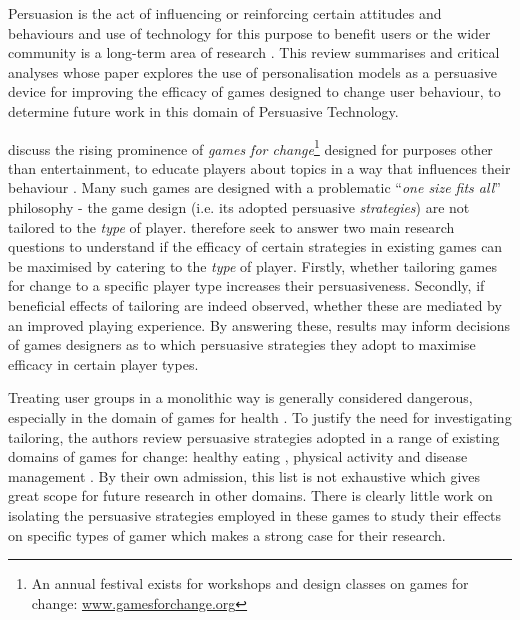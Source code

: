 \documentclass[11pt]{article}
\begin{document}

Persuasion is the act of influencing or reinforcing certain attitudes and behaviours \citep{khaled2008} and use of technology for this purpose to benefit users or the wider community is a long-term area of research \citep{fogg2002}. This review summarises and critical analyses \citet{orji2017} whose paper explores the use of personalisation models as a persuasive device for improving the efficacy of games designed to change user behaviour, to determine future work in this domain of Persuasive Technology.

\citet{orji2017} discuss the rising prominence of \textit{games for change}\footnote{An annual festival exists for workshops and design classes on games for change: \url{www.gamesforchange.org}} designed for purposes other than entertainment, to educate players about topics in a way that influences their behaviour \citep{busch2015}. Many such games are designed with a problematic ``\textit{one size fits all}'' philosophy - the game design (i.e. its adopted persuasive \textit{strategies}) are not tailored to the \textit{type} of player. \citet{orji2017} therefore seek to answer two main research questions to understand if the efficacy of certain strategies in existing games \citep{peng2009,kaipainen2012} can be maximised by catering to the \textit{type} of player. Firstly, whether tailoring games for change to a specific player type increases their persuasiveness. Secondly, if beneficial effects of tailoring are indeed observed, whether these are mediated by an improved playing experience. By answering these, results may inform decisions of games designers as to which persuasive strategies they adopt to maximise efficacy in certain player types. 

Treating user groups in a monolithic way is generally considered dangerous, especially in the domain of games for health \citep{berkovsky2010}.  To justify the need for investigating tailoring, the authors review persuasive strategies adopted in a range of existing domains of games for change: healthy eating \citep{kaipainen2012, orji2013b}, physical activity \citep{fujiki2008} and disease management \citep{brownson2007}. By their own admission, this list is not exhaustive which gives great scope for future research in other domains. There is clearly little work on isolating the persuasive strategies employed in these games to study their effects on specific types of gamer which makes a strong case for their research.
\end{document}
